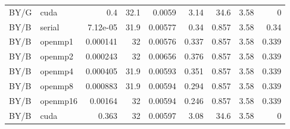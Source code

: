\documentclass[11pt]{article}
\begin{document}
\begin{longtable}{llrrrrrrr}
BY/G & cuda & 0.4 & 32.1 & 0.0059 & 3.14 & 34.6 & 3.58 & 0\\
BY/B & serial & 7.12e-05 & 31.9 & 0.00577 & 0.34 & 0.857 & 3.58 & 0.34\\
BY/B & openmp1 & 0.000141 & 32 & 0.00576 & 0.337 & 0.857 & 3.58 & 0.339\\
BY/B & openmp2 & 0.000243 & 32 & 0.00656 & 0.376 & 0.857 & 3.58 & 0.339\\
BY/B & openmp4 & 0.000405 & 31.9 & 0.00593 & 0.351 & 0.857 & 3.58 & 0.339\\
BY/B & openmp8 & 0.000883 & 31.9 & 0.00594 & 0.294 & 0.857 & 3.58 & 0.339\\
BY/B & openmp16 & 0.00164 & 32 & 0.00594 & 0.246 & 0.857 & 3.58 & 0.339\\
BY/B & cuda & 0.363 & 32 & 0.00597 & 3.08 & 34.6 & 3.58 & 0\\
\bottomrule\end{longtable}\normalsize
\end{document}

